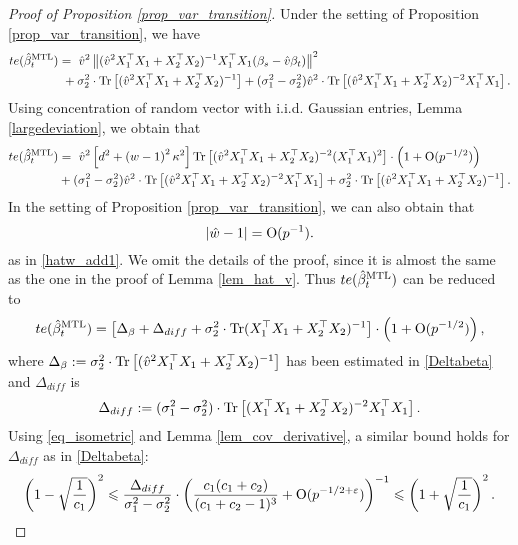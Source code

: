 \begin{proof}[Proof of Proposition \ref{prop_var_transition}]

Under the setting of Proposition \ref{prop_var_transition}, we have
\begin{align*}
	te(\hat{\beta}_t^{\text{MTL}}) &=~ \hat{v}^2 \left\|  (\hat{v}^2 X_1^{\top}X_1 + X_2^{\top}X_2)^{-1} X_1^{\top}X_1 (\beta_s - \hat{v} \beta_t) \right\|^2 \nonumber \\
			&~ + \sigma_2^2 \cdot \operatorname{Tr}\left[(\hat{v}^2 X_1^{\top}X_1 + X_2^{\top}X_2)^{-1} \right] + (\sigma_1^2 -\sigma_2^2)\hat v^2  \cdot \operatorname{Tr}\left[(\hat{v}^2 X_1^{\top}X_1 + X_2^{\top}X_2)^{-2} X_1^\top X_1\right].
\end{align*}
Using concentration of random vector with i.i.d. Gaussian entries, Lemma \ref{largedeviation}, we obtain that
\begin{align*}
	te(\hat{\beta}_t^{\text{MTL}}) &=~ \hat{v}^2 \left[d^2 +\left( w-1\right)^2\kappa^2\right]\operatorname{Tr}\left[ (\hat{v}^2 X_1^{\top}X_1 + X_2^{\top}X_2)^{-2} (X_1^{\top}X_1)^2\right] \cdot \left(1+\operatorname{O}(p^{-1/2})\right)\nonumber \\
	& + (\sigma_1^2 -\sigma_2^2)\hat v^2  \cdot \operatorname{Tr}\left[(\hat{v}^2 X_1^{\top}X_1 + X_2^{\top}X_2)^{-2} X_1^\top X_1\right] + \sigma_2^2 \cdot \operatorname{Tr}\left[(\hat{v}^2 X_1^{\top}X_1 + X_2^{\top}X_2)^{-1} \right].
\end{align*}
In the setting of Proposition \ref{prop_var_transition}, we can also obtain that
$$|\hat w-1|=\operatorname{O}(p^{-1}).$$
as in \eqref{hatw_add1}. We omit the details of the proof, since it is almost the same as the one in the proof of Lemma \ref{lem_hat_v}. Thus $te(\hat{\beta}_t^{\text{MTL}}) $ can be reduced to 
$$	te(\hat{\beta}_t^{\text{MTL}}) = \left[\Delta_\beta + \Delta_{diff}+  \sigma_2^2 \cdot \operatorname{Tr}(X_1^{\top}X_1 + X_2^{\top}X_2)^{-1} \right]\cdot \left(1+\operatorname{O}(p^{-1/2})\right), $$
where $\Delta_\beta:= \sigma_2^2 \cdot \operatorname{Tr}\left[(\hat{v}^2 X_1^{\top}X_1 + X_2^{\top}X_2)^{-1} \right]$ has been estimated in \eqref{Deltabeta} and $\Delta_{diff}$ is
\begin{align*}	
	\Delta_{diff}:=(\sigma_1^2 -\sigma_2^2) \cdot \operatorname{Tr}\left[(X_1^{\top}X_1 + X_2^{\top}X_2)^{-2} X_1^\top X_1\right] .
\end{align*}
Using \eqref{eq_isometric} and Lemma \ref{lem_cov_derivative}, a similar bound holds for $\Delta_{diff}$ as in \eqref{Deltabeta}:
$$\left({1 - \sqrt{\frac{1}{c_1}}}\right)^2\leqslant \frac{\Delta_{diff}}{\sigma_1^2 -\sigma_2^2}\cdot \left( \frac{c_1 (c_1+c_2)}{(c_1+c_2-1)^3} + \operatorname{O}(p^{-1/2+{\varepsilon}})\right)^{-1}\leqslant \left({1 + \sqrt{\frac{1}{c_1}}}\right)^2.$$


\end{proof}
